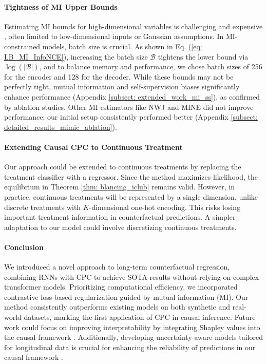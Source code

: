 \documentclass{article}
\theoremstyle{plain}
\theoremstyle{definition}
\theoremstyle{remark}
\begin{document}
\paragraph{Tightness of MI Upper Bounds}  
Estimating MI bounds for high-dimensional variables is challenging and expensive \citep{rainforth2018tighter, poole2019VBMI}, often limited to low-dimensional inputs or Gaussian assumptions. In MI-constrained models, batch size is crucial. As shown in Eq. (\ref{eq: LB_MI_InfoNCE}), increasing the batch size \(\mathcal{B}\) tightens the lower bound via \(\log(|\mathcal{B}|)\), and to balance memory and performance, we chose batch sizes of 256 for the encoder and 128 for the decoder. While these bounds may not be perfectly tight, mutual information and self-supervision biases significantly enhance performance (Appendix \ref{subsect: extended_work_mi_ss}), as confirmed by ablation studies. Other MI estimators like NWJ and MINE \citep{nguyen2010estimating, belghazi2018mutual} did not improve performance; our initial setup consistently performed better (Appendix \ref{subsect: detailed_results_mimic_ablation}).

\paragraph{Extending Causal CPC to Continuous Treatment}  
Our approach could be extended to continuous treatments by replacing the treatment classifier with a regressor. Since the method maximizes likelihood, the equilibrium in Theorem \ref{thm: blancing_iclub} remains valid. However, in practice, continuous treatments will be represented by a single dimension, unlike discrete treatments with \(K\)-dimensional one-hot encoding. This risks losing important treatment information in counterfactual predictions. A simpler adaptation to our model could involve discretizing continuous treatments. %

\paragraph{Conclusion} We introduced a novel approach to long-term counterfactual regression, combining RNNs with CPC to achieve SOTA results without relying on complex transformer models. Prioritizing computational efficiency, we incorporated contrastive loss-based regularization guided by mutual information (MI). Our method consistently outperforms existing models on both synthetic and real-world datasets, marking the first application of CPC in causal inference. Future work could focus on improving interpretability by integrating Shapley values into the causal framework \citep{heskes2020causalSahap}. Additionally, developing uncertainty-aware models tailored for longitudinal data is crucial for enhancing the reliability of predictions in our causal framework \citep{de2022predicting, jesson2020identifying, yin2024conformal}.
\end{document}
